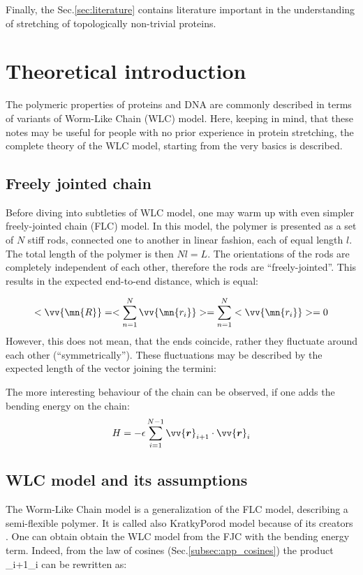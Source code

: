 \documentclass[11pt]{article}
\begin{document}
Finally, the Sec.\ref{sec:literature} contains literature important in the understanding of stretching of topologically non-trivial proteins.

\section*{Theoretical introduction}
\label{sec:wlc}
The polymeric properties of proteins and DNA are commonly described in terms of variants of Worm-Like Chain (WLC) model.
Here, keeping in mind, that these notes may be useful for people with no prior experience in protein stretching, the complete theory of the WLC model, starting from the very basics is described.

\subsection*{Freely jointed chain}
\label{subsec:wlc_flc}
Before diving into subtleties of WLC model, one may warm up with even simpler freely-jointed chain (FLC) model.
In this model, the polymer is presented as a set of $N$ stiff rods, connected one to another in linear fashion, each of equal length $l$.
The total length of the polymer is then $Nl=L$.
The orientations of the rods are completely independent of each other, therefore the rods are ``freely-jointed''.
This results in the expected end-to-end distance, which is equal:

\begin{equation}
    <\vv{\mn{R}} = <\sum_{n=1}^N \vv{\mn{r_i}}> = \sum_{n=1}^N <\vv{\mn{r_i}}> = 0
\end{equation}
However, this does not mean, that the ends coincide, rather they fluctuate around each other (``symmetrically'').
These fluctuations may be described by the expected length of the vector joining the termini:

The more interesting behaviour of the chain can be observed, if one adds the bending energy on the chain:
\begin{equation}
    \label{eq:wlc_assumptions_discrete}
    H = -\epsilon\sum_{i=1}^{N-1}\vv{\bm{r}}_{i+1}\cdot\vv{\bm{r}}_{i}
\end{equation}

\subsection*{WLC model and its assumptions}
\label{subsec:wlc_assumptions}
The Worm-Like Chain model is a generalization of the FLC model, describing a semi-flexible polymer.
It is called also Kratky\–Porod model because of its creators \cite{kratky1949rontgenuntersuchung}.
One can obtain obtain the WLC model from the FJC with the bending energy term.
Indeed, from the law of cosines (Sec.\ref{subsec:app_cosines}) the product _{i+1}\cdot{}_{i} can be rewritten as:
\end{document}
